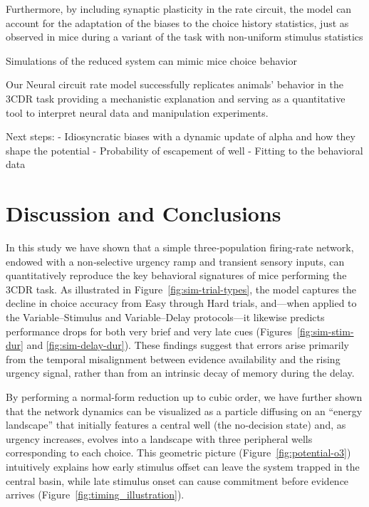 \documentclass[ESP]{fancynotes}
\title{{\textbf{}}\vspace{-2em}}
\begin{document}
\date{}

Furthermore, by including synaptic plasticity in the rate circuit, the model can account for the adaptation of the biases to the choice history statistics, just as observed in mice during a variant of the task with non-uniform stimulus statistics

Simulations of the reduced system can mimic mice choice behavior

Our Neural circuit rate model successfully replicates animals’ behavior in the 3CDR task providing a mechanistic explanation and serving as a quantitative tool to interpret neural data and manipulation experiments.


Next steps:
- Idiosyncratic biases with a dynamic update of alpha and how they shape the potential
- Probability of escapement of well
- Fitting to the behavioral data

\section{Discussion and Conclusions}
In this study we have shown that a simple three‐population firing‐rate network, endowed with a non‐selective urgency ramp and transient sensory inputs, can quantitatively reproduce the key behavioral signatures of mice performing the 3CDR task. As illustrated in Figure~\ref{fig:sim-trial-types}, the model captures the decline in choice accuracy from Easy through Hard trials, and—when applied to the Variable–Stimulus and Variable–Delay protocols—it likewise predicts performance drops for both very brief and very late cues (Figures~\ref{fig:sim-stim-dur} and \ref{fig:sim-delay-dur}). These findings suggest that errors arise primarily from the temporal misalignment between evidence availability and the rising urgency signal, rather than from an intrinsic decay of memory during the delay.

By performing a normal‐form reduction up to cubic order, we have further shown that the network dynamics can be visualized as a particle diffusing on an “energy landscape” that initially features a central well (the no‐decision state) and, as urgency increases, evolves into a landscape with three peripheral wells corresponding to each choice. This geometric picture (Figure~\ref{fig:potential-o3}) intuitively explains how early stimulus offset can leave the system trapped in the central basin, while late stimulus onset can cause commitment before evidence arrives (Figure~\ref{fig:timing_illustration}).
\end{document}
